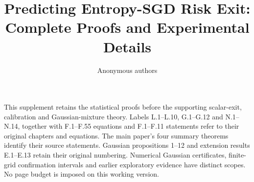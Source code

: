 \documentclass[10pt,twocolumn,letterpaper]{article}
\title{Predicting Entropy-SGD Risk Exit:\\Complete Proofs and Experimental Details}
\author{Anonymous authors}
\begin{document}
\onecolumn
\maketitle
\noindent This supplement retains the statistical proofs before the supporting scalar-exit, calibration and Gaussian-mixture theory. Labels L.1--L.10, G.1--G.12 and N.1--N.14, together with F.1--F.55 equations and F.1--F.11 statements refer to their original chapters and equations. The main paper's four summary theorems identify their source statements. Gaussian propositions 1--12 and extension results E.1--E.13 retain their original numbering. Numerical Gaussian certificates, finite-grid confirmation intervals and earlier exploratory evidence have distinct scopes. No page budget is imposed on this working version.
\tableofcontents
\clearpage

\clearpage

\clearpage

\clearpage

\clearpage

\clearpage

\clearpage

\clearpage

\clearpage

\clearpage

\clearpage

\clearpage
\end{document}
